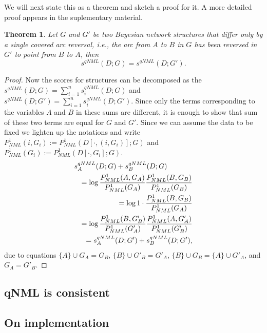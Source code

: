 \documentclass[letterpaper]{article}
\newtheorem{theorem}{Theorem}
\begin{document}
We will next state this as a
theorem and sketch a proof for it. A more detailed proof appears in the
suplementary material.
\begin{theorem}
  \label{thm:scoreqv}
  Let $G$ and $G'$ be two Bayesian network structures that differ only
  by a single covered arc reversal, i.e., the arc from $A$ to $B$ in $G$
  has been reversed in $G'$ to point from $B$ to $A$, then
  $$s^{qNML}(D;G)=s^{qNML}(D;G').$$
\end{theorem}
\begin{proof}
  Now the scores for structures can be decomposed as the
  $s^{qNML}(D;G)=\sum_{i=1}^{n}s_i^{qNML}(D;G)$ and
  $s^{qNML}(D;G')=\sum_{i=1}^{n}s_i^{qNML}(D;G')$.  Since only the
  terms corresponding to the variables $A$ and $B$ in these sums are
  different, it is enough to show that sum of these two terms are
  equal for $G$ and $G'$. Since we can assume the data to be fixed we
  lighten up the notations and write
  $P^1_{NML}(i,G_i) := P^1_{NML}(D[\cdot,(i,G_i)];G)$ and
  $P^1_{NML}(G_i)   := P^1_{NML}(D[\cdot,G_i];G)$.
  \begin{eqnarray}
    \lefteqn{s_A^{qNML}(D;G)+s_B^{qNML}(D;G)} \nonumber\\
    && =\log\frac{P^1_{NML}(A,G_{A})}{P^1_{NML}(G_{A})}
            \frac{P^1_{NML}(B,G_{B})}{P^1_{NML}(G_{B})}\nonumber\\
    && =\log 1\cdot\frac{P^1_{NML}(B,G_{B})}{P^1_{NML}(G_{A})}\nonumber\\
    && =\log \frac{P^1_{NML}(B,G'_{B})}{P^1_{NML}(G'_{A})}
             \frac{P^1_{NML}(A,G'_{A})}{P^1_{NML}(G'_{B})}\nonumber\\
 && =s_A^{qNML}(D;G')+s_B^{qNML}(D;G'),\nonumber
\end{eqnarray}
  due to equations
  $\{A\}\cup G_A  = G_B$,
  $\{B\}\cup G'_B = G'_A$,
  $\{B\}\cup G_B  = \{A\} \cup G'_A$,
  and $G_A        = G'_B$.
\end{proof}

\subsection{qNML is consistent}


\subsection {On implementation}
\end{document}
